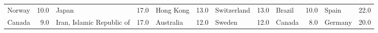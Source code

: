 \begin{tabular}{lrlrlrlrlrlr}
                    Norway &           10.0 &                      Japan &               17.0 &                  Hong Kong &           13.0 &         Switzerland &               13.0 &          Brazil &           10.0 &               Spain &               22.0 \\
                    Canada &            9.0 &  Iran, Islamic Republic of &               17.0 &                  Australia &           12.0 &              Sweden &               12.0 &          Canada &            8.0 &             Germany &               20.0 \\
\bottomrule
\end{tabular}
